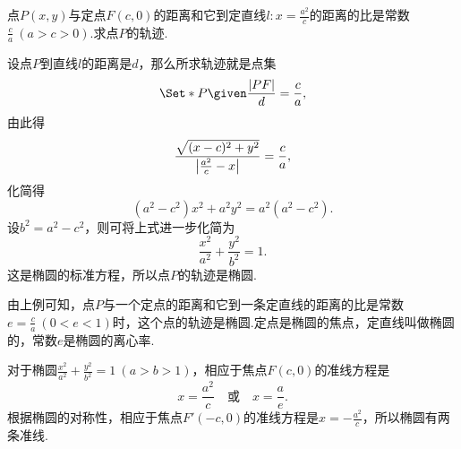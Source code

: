 \begin{example}
点\(P(x,y)\)与定点\(F(c,0)\)的距离和它到定直线\(l: x = \frac{a^2}{c}\)的距离的比是常数\(\frac{c}{a}\ (a > c > 0)\).求点\(P\)的轨迹.
\begin{solution}
设点\(P\)到直线\(l\)的距离是\(d\)，那么所求轨迹就是点集\[
\Set*{ P \given \frac{\abs{PF}}{d} = \frac{c}{a} },
\]由此得\[
\frac{\sqrt{(x-c)^2+y^2}}{\abs{\frac{a^2}{c}-x}} = \frac{c}{a},
\]化简得\[
(a^2-c^2)x^2 + a^2 y^2 = a^2(a^2-c^2).
\]设\(b^2=a^2-c^2\)，则可将上式进一步化简为\[
\frac{x^2}{a^2}+\frac{y^2}{b^2}=1.
\]这是椭圆的标准方程，所以点\(P\)的轨迹是椭圆.
\end{solution}

由上例可知，点\(P\)与一个定点的距离和它到一条定直线的距离的比是常数\(e = \frac{c}{a}\ (0 < e < 1)\)时，这个点的轨迹是椭圆.定点是椭圆的焦点，定直线叫做椭圆的，常数\(e\)是椭圆的离心率.

对于椭圆\(\frac{x^2}{a^2}+\frac{y^2}{b^2}=1\ (a>b>1)\)，相应于焦点\(F(c,0)\)的准线方程是\[
x = \frac{a^2}{c}
\quad\text{或}\quad
x = \frac{a}{e}.
\]根据椭圆的对称性，相应于焦点\(F'(-c,0)\)的准线方程是\(x=-\frac{a^2}{c}\)，所以椭圆有两条准线.
\end{example}

